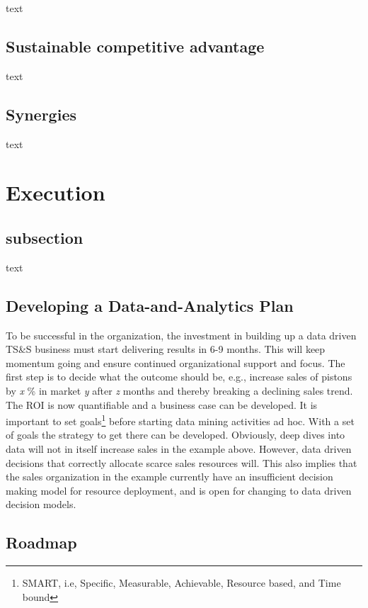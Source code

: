 \documentclass[10pt]{article} %
\begin{document}
text

\subsection{Sustainable competitive advantage}

text

\subsection{Synergies}

text


\section{Execution}

\subsection{subsection}

text


\subsection{Developing a Data-and-Analytics Plan}

To be successful in the organization, the investment in building up a data driven TS\&S business must start delivering results in 6-9 months. This will keep momentum going and ensure continued organizational support and focus. The first step is to decide what the outcome should be, e.g., increase sales of pistons by \textit{x} \% in market \textit{y} after \textit{z} months and thereby breaking a declining sales trend. The ROI is now quantifiable and a business case can be developed. It is important to set goals\footnote{SMART, i.e, Specific, Measurable, Achievable, Resource based, and Time bound} before starting data mining activities ad hoc. With a set of goals the strategy to get there can be developed. Obviously, deep dives into data will not in itself increase sales in the example above. However, data driven decisions that correctly allocate scarce sales resources will. This also implies that the sales organization in the example currently have an insufficient decision making model for resource deployment, and is open for changing to data driven decision models.


\subsection{Roadmap}
\end{document}
